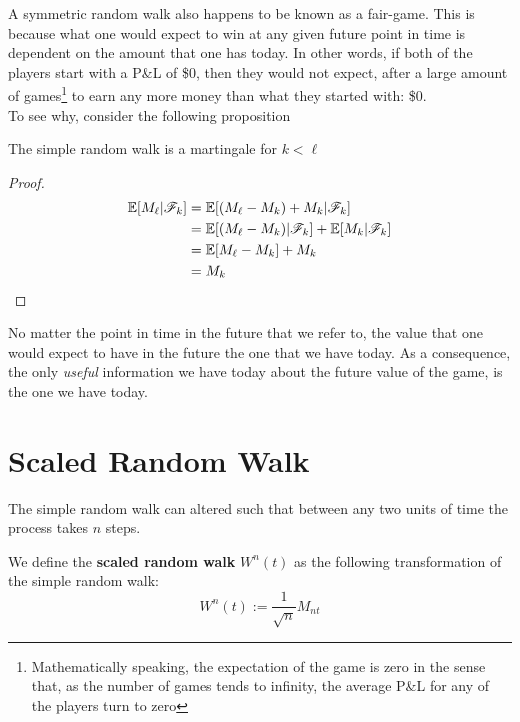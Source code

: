 \documentclass[../TGMAFFIRO]{subfiles}
\begin{document}
A symmetric random walk also happens to be known as a fair-game. This is because what one would expect to win at any given future point in time is dependent on the amount that one has today. In other words, if both of the players start with a P\&L of \$0, then they would not expect, after a large amount of games\footnote{Mathematically speaking, the expectation of the game is zero in the sense that, as the number of games tends to infinity, the average P\&L for any of the players turn to zero} to earn any more money than what they started with: \$0.\\

To see why, consider the following proposition

\begin{proposition}
	The simple random walk is a martingale for $k < \ell$
\end{proposition}

\begin{proof}
	\begin{align*}
				\mathbb{E}[M_\ell|\mathscr{F}_k] &= \mathbb{E}[(M_\ell - M_k) + M_k | \mathscr{F}_k] \\
				&= \mathbb{E}[(M_\ell - M_k) | \mathscr{F}_k] + \mathbb{E}[M_k | \mathscr{F}_k] \\
				&= \mathbb{E}[M_\ell - M_k] + M_k\\
				&= M_k
	\end{align*}
\end{proof}

No matter the point in time in the future that we refer to, the value that one would expect to have in the future the one that we have today. As a consequence, the only \textit{useful} information we have today about the future value of the game, is the one we have today.

\section{Scaled Random Walk}
The simple random walk can altered such that between any two units of time the process takes $n$ steps.

\begin{definition}
	We define the \textbf{scaled random walk} $W^n(t)$ as the following transformation of the simple random walk:
	\[W^n(t) := \frac{1}{\sqrt{n}}M_{nt}\]
\end{definition}
\end{document}
